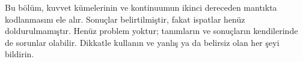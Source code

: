 \documentclass[../../../include/open-logic-chapter]{subfiles}
\begin{document}

\begin{editorial}
Bu bölüm, kuvvet kümelerinin ve kontinuumun ikinci dereceden mantıkta
kodlanmasını ele alır. Sonuçlar belirtilmiştir, fakat ispatlar henüz
doldurulmamıştır. Henüz problem yoktur; tanımların ve sonuçların kendilerinde
de sorunlar olabilir. Dikkatle kullanın ve yanlış ya da belirsiz olan her
şeyi bildirin.
\end{editorial}





\OLEndChapterHook
\end{document}
